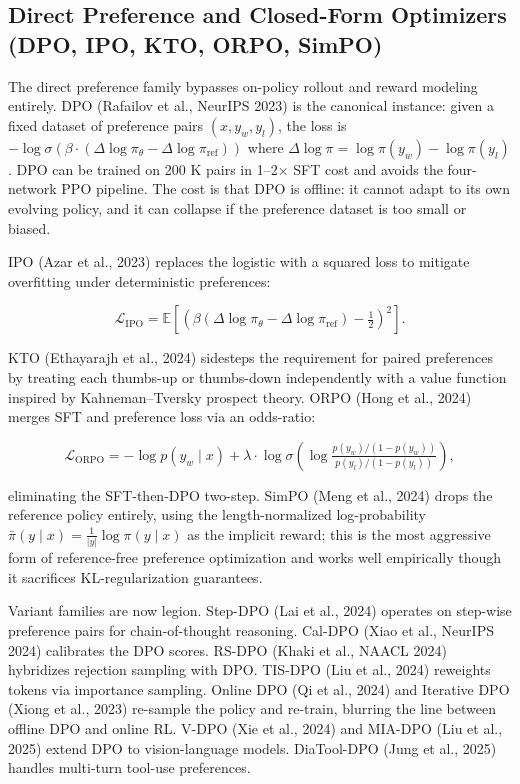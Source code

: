 \subsection{Direct Preference and Closed-Form Optimizers (DPO, IPO, KTO, ORPO, SimPO)}\label{direct-preference-and-closed-form-optimizers-dpo-ipo-kto-orpo-simpo}

The direct preference family bypasses on-policy rollout and reward modeling entirely. DPO (Rafailov et al., NeurIPS 2023) is the canonical instance: given a fixed dataset of preference pairs \((x, y_w, y_l)\), the loss is \(-\log \sigma(\beta \cdot (\Delta\log \pi_\theta - \Delta\log \pi_{\text{ref}}))\) where \(\Delta\log \pi = \log\pi(y_w) - \log\pi(y_l)\). DPO can be trained on 200 K pairs in 1--2× SFT cost and avoids the four-network PPO pipeline. The cost is that DPO is offline: it cannot adapt to its own evolving policy, and it can collapse if the preference dataset is too small or biased.

IPO (Azar et al., 2023) replaces the logistic with a squared loss to mitigate overfitting under deterministic preferences:

\[\mathcal{L}_{\mathrm{IPO}} = \mathbb{E}\!\left[ \left(\beta(\Delta\log\pi_\theta - \Delta\log\pi_{\text{ref}}) - \tfrac{1}{2}\right)^2 \right].\]

KTO (Ethayarajh et al., 2024) sidesteps the requirement for paired preferences by treating each thumbs-up or thumbs-down independently with a value function inspired by Kahneman--Tversky prospect theory. ORPO (Hong et al., 2024) merges SFT and preference loss via an odds-ratio:

\[\mathcal{L}_{\mathrm{ORPO}} = -\log p(y_w \mid x) + \lambda \cdot \log \sigma(\log \tfrac{p(y_w)/(1-p(y_w))}{p(y_l)/(1-p(y_l))}),\]

eliminating the SFT-then-DPO two-step. SimPO (Meng et al., 2024) drops the reference policy entirely, using the length-normalized log-probability \(\bar\pi(y\mid x) = \tfrac{1}{|y|}\log\pi(y\mid x)\) as the implicit reward; this is the most aggressive form of reference-free preference optimization and works well empirically though it sacrifices KL-regularization guarantees.

Variant families are now legion. Step-DPO (Lai et al., 2024) operates on step-wise preference pairs for chain-of-thought reasoning. Cal-DPO (Xiao et al., NeurIPS 2024) calibrates the DPO scores. RS-DPO (Khaki et al., NAACL 2024) hybridizes rejection sampling with DPO. TIS-DPO (Liu et al., 2024) reweights tokens via importance sampling. Online DPO (Qi et al., 2024) and Iterative DPO (Xiong et al., 2023) re-sample the policy and re-train, blurring the line between offline DPO and online RL. V-DPO (Xie et al., 2024) and MIA-DPO (Liu et al., 2025) extend DPO to vision-language models. DiaTool-DPO (Jung et al., 2025) handles multi-turn tool-use preferences.

